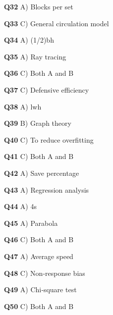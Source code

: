 \textbf{Q32} A) Blocks per set\par
\textbf{Q33} C) General circulation model\par
\textbf{Q34} A) (1/2)bh\par
\textbf{Q35} A) Ray tracing\par
\textbf{Q36} C) Both A and B\par
\textbf{Q37} C) Defensive efficiency\par
\textbf{Q38} A) lwh\par
\textbf{Q39} B) Graph theory\par
\textbf{Q40} C) To reduce overfitting\par
\textbf{Q41} C) Both A and B\par
\textbf{Q42} A) Save percentage\par
\textbf{Q43} A) Regression analysis\par
\textbf{Q44} A) 4s\par
\textbf{Q45} A) Parabola\par
\textbf{Q46} C) Both A and B\par
\textbf{Q47} A) Average speed\par
\textbf{Q48} C) Non‑response bias\par
\textbf{Q49} A) Chi‑square test\par
\textbf{Q50} C) Both A and B\par